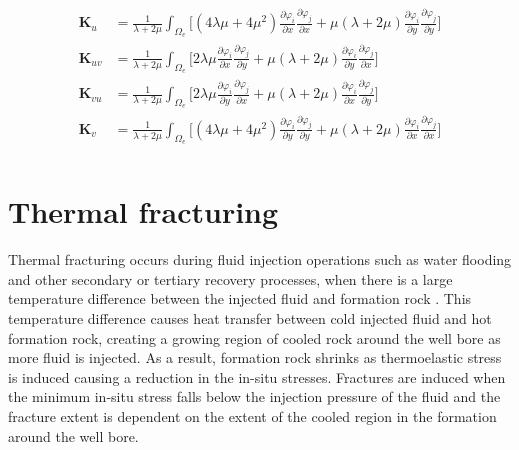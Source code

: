 \documentclass[12pt]{article}
\begin{document}
\begin{equation}		\label{eq50b}
\begin{split}
\mathbf{K}_{u}&=\frac{1}{\lambda+2\mu}\int_{\Omega_e}\Bigg[(4\lambda\mu+4\mu^2)\frac{\partial \varphi_i}{\partial x}\frac{\partial \varphi_j}{\partial x}+\mu(\lambda+2\mu)\frac{\partial \varphi_i}{\partial y}\frac{\partial \varphi_j}{\partial y} \Bigg]	\\
%
\mathbf{K}_{{uv}}&=\frac{1}{\lambda+2\mu}\int_{\Omega_e}\Bigg[2 \lambda\mu\frac{\partial \varphi_i}{\partial x}\frac{\partial \varphi_j}{\partial y} + \mu(\lambda+2\mu)\frac{\partial \varphi_i}{\partial y}\frac{\partial \varphi_j}{\partial x}  \Bigg]	\\
%
%
\mathbf{K}_{{vu}}&= \frac{1}{\lambda+2\mu}\int_{\Omega_e}\Bigg[2\lambda\mu\frac{\partial \varphi_i}{\partial y}\frac{\partial \varphi_j}{\partial x}+\mu(\lambda+2\mu)\frac{\partial \varphi_i}{\partial x}\frac{\partial \varphi_j}{\partial y} \Bigg] 		\\
%
\mathbf{K}_{{v}}&=\frac{1}{\lambda+2\mu}\int_{\Omega_e}\Bigg[(4\lambda\mu+4\mu^2)\frac{\partial \varphi_i}{\partial y}\frac{\partial \varphi_j}{\partial y}+\mu(\lambda+2\mu)\frac{\partial \varphi_i}{\partial x}\frac{\partial \varphi_j}{\partial x} \Bigg]		\\
\end{split}
\end{equation}

\section{Thermal fracturing}
Thermal fracturing occurs during fluid injection operations such as water flooding and other secondary or tertiary recovery processes, when there is a large temperature difference between the injected fluid and formation rock \cite{perkins1,fjaer,settari4}. This temperature difference causes heat transfer between cold injected fluid and hot formation rock, creating a growing region of cooled rock around the well bore as more fluid is injected. As a result, formation rock shrinks as thermoelastic stress is induced causing a reduction in the in-situ stresses. Fractures are induced when the minimum in-situ stress falls below the injection pressure of the fluid and the fracture extent is dependent on the extent of the cooled region in the formation around the well bore.
\end{document}
